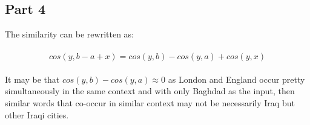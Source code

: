 \documentclass[11pt]{article}
\begin{document}
\subsection*{Part 4}
The similarity can be rewritten as:

\begin{align}
	\begin{split}
	cos(y, b-a+x) = cos(y,b) - cos(y,a) + cos(y,x)
	\end{split}
\end{align}

\noindent It may be that $cos(y,b) - cos(y,a) \approx 0$ as London and England occur pretty simultaneously in the same context and with only Baghdad as the input, then similar words that
co-occur in similar context may not be necessarily Iraq but other Iraqi cities. 
\end{document}

